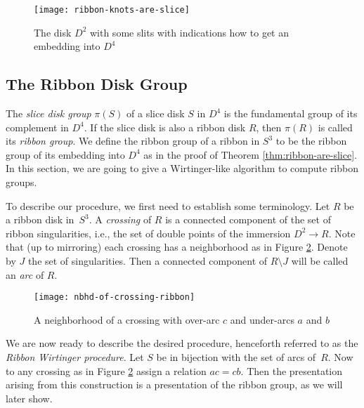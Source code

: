 \documentclass[main.tex]{subfiles}
\begin{document}
\begin{figure}[htb]
\centering
\texttt{[image: ribbon-knots-are-slice]}
\caption{The disk $D^2$ with some slits with indications how to get an embedding into $D^4$}
\label{fig:ribbon-knots-are-slice}
\end{figure}

\subsection{The Ribbon Disk Group}
The \textit{slice disk group} $\pi(S)$ of a slice disk $S$ in $D^4$ is the fundamental group of its complement in $D^4$. If the slice disk is also a ribbon disk $R$, then $\pi(R)$ is called its \textit{ribbon group}. We define the ribbon group of a ribbon in $S^3$ to be the ribbon group of its embedding into $D^4$ as in the proof of Theorem \ref{thm:ribbon-are-slice}. In this section, we are going to give a Wirtinger-like algorithm to compute ribbon groups.

To describe our procedure, we first need to establish some terminology. Let $R$ be a ribbon disk in~$S^3$. A \textit{crossing} of $R$ is a connected component of the set of ribbon singularities, i.e., the set of double points of the immersion $D^2 \rightarrow R$. Note that (up to mirroring) each crossing has a neighborhood as in Figure \ref{fig:nbhd-of-crossing-ribbon}. Denote by $J$ the set of singularities. Then a connected component of $R \setminus J$ will be called an \textit{arc} of $R$.

\begin{figure}[htb]
\centering
\texttt{[image: nbhd-of-crossing-ribbon]}
\caption{A neighborhood of a crossing with over-arc $c$ and under-arcs $a$ and $b$}
\label{fig:nbhd-of-crossing-ribbon}
\end{figure}

We are now ready to describe the desired procedure, henceforth referred to as the \textit{Ribbon Wirtinger procedure}. Let $S$ be in bijection with the set of arcs of~$R$. Now to any crossing as in Figure \ref{fig:nbhd-of-crossing-ribbon} assign a relation $ac = cb$. Then the presentation arising from this construction is a presentation of the ribbon group, as we will later show.
\end{document}
